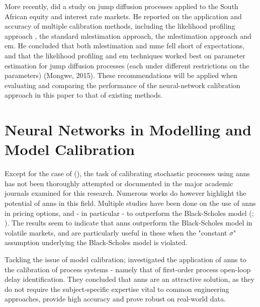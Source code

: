\documentclass[11pt,oneside,openany,a4paper,english, report, goldenblock
]{usthesis}
\begin{document}
More recently, \citet{Mongwe} did a study on jump diffusion processes applied to the South African equity and interest rate markets. He reported on the application and accuracy of multiple calibration methods, including the likelihood profiling approach \citep{Honore}, the standard \acrshort{mlestimation} approach, the \acrshort{mlestimation} approach and \acrfull{em}. He concluded that both \acrshort{mlestimation} and \acrshort{mme} fell short of expectations, and that the likelihood profiling and \acrshort{em} techniques worked best on parameter estimation for jump diffusion processes (each under different restrictions on the parameters) (Mongwe, 2015). These recommendations will be applied when evaluating and comparing the performance of the neural-network calibration approach in this paper to that of existing methods.


\section{Neural Networks in Modelling and Model Calibration}
Except for the case of  (\citeyear{Xie}), the task of calibrating stochastic processes using \acrshort{ann}s has not been thoroughly attempted or documented in the major academic journals examined for this research. Numerous works do however highlight the potential of \acrshort{ann}s in this field.
Multiple studies have been done on the use of \acrshort{ann}s in pricing options, and - in particular - to outperform the Black-Scholes model (; \citeyear{Yao}). The results seem to indicate that \acrshort{ann}s outperform the Black-Scholes model in volatile markets, and are particularly useful in these when the "constant $\sigma$" assumption underlying the Black-Scholes model is violated.


Tackling the issue of model calibration; \citet{Samad} investigated the application of \acrshort{ann}s to the calibration of process systems - namely that of first-order process open-loop delay identification. They concluded that \acrshort{ann}s are an attractive solution, as they do not require the subject-specific expertise vital to common engineering approaches, provide high accuracy and prove robust on real-world data.
\end{document}
